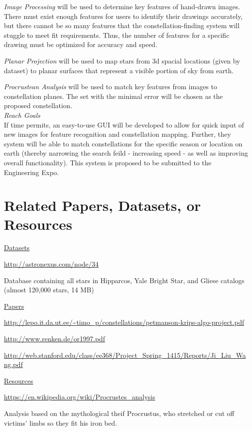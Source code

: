\documentclass{article}
\begin{document}
\textit{Image Processing} will be used to determine key features of hand-drawn images. There must exist enough features for users to identify their drawings accurately, but there cannot be so many features that the constellation-finding system will stuggle to meet fit requirements. Thus, the number of features for a specific drawing must be optimized for accuracy and speed. \par
\textit{Planar Projection} will be used to map stars from 3d spacial locations (given by dataset) to planar surfaces that represent a visible portion of sky from earth. \par
\textit{Procrustean Analysis} will be used to match key features from images to constellation planes. The set with the minimal error will be chosen as the proposed constellation. \\
\hfill \break
\textit{Reach Goals}\\
If time permits, an easy-to-use GUI will be developed to allow for quick input of new images for feature recognition and constellation mapping. Further, they system will be able to match constellations for the specific season or location on earth (thereby narrowing the search feild - increasing speed - as well as improving overall functionality). This system is proposed to be submitted to the Engineering Expo. 


\section{Related Papers, Datasets, or Resources}

\underline{Datasets}\par
\url{http://astronexus.com/node/34}\par
Database containing all stars in Hipparcos, Yale Bright Star, and Gliese catalogs (almost 120,000 stars, 14 MB)\par

\hfill \break
\underline{Papers}\par
\url{http://lepo.it.da.ut.ee/~timo_p/constellations/petmanson-krips-algo-project.pdf}\par
\url{http://www.renken.de/or1997.pdf}\par
\url{http://web.stanford.edu/class/ee368/Project_Spring_1415/Reports/Ji_Liu_Wang.pdf}\par

\hfill \break
\underline{Resources}\par
\url{https://en.wikipedia.org/wiki/Procrustes_analysis}\par
Analysis based on the mythological theif Procrustus, who stretched or cut off victims' limbs so they fit his iron bed. \par
\end{document}
